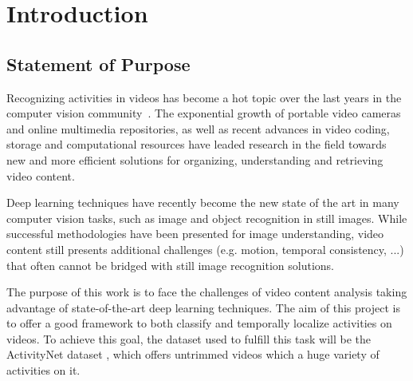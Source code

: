 \chapter{Introduction}

\section{Statement of Purpose}

Recognizing activities in videos has become a hot topic over the last years in the computer vision community~\cite{ngiam2011multimodal}. The exponential growth of portable video cameras and online multimedia repositories, as well as recent advances in video coding, storage and computational resources have leaded research in the field towards new and more efficient solutions for organizing, understanding and retrieving video content.

Deep learning techniques have recently become the new state of the art in many computer vision tasks, such as image and object recognition in still images. While successful methodologies have been presented for image understanding, video content still presents additional challenges (e.g. motion, temporal consistency, ...)  that often cannot be bridged with still image recognition solutions.  

The purpose of this work is to face the challenges of video content analysis taking advantage of state-of-the-art deep learning techniques. The aim of this project is to offer a good framework to both classify and temporally localize activities on videos. To achieve this goal, the dataset used to fulfill this task will be the ActivityNet dataset \cite{caba2015activitynet}, which offers untrimmed videos which a huge variety of activities on it.



